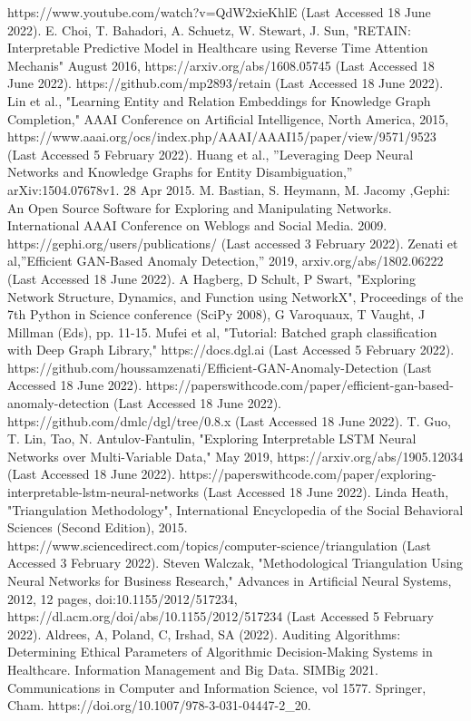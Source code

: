 \documentclass[conference]{IEEEtran}
\begin{document}
\begin{thebibliography}{00}
 https://www.youtube.com/watch?v=QdW2xieKhlE (Last Accessed 18 June 2022).
 E. Choi, T. Bahadori, A. Schuetz, W. Stewart, J. Sun, "RETAIN: Interpretable Predictive Model in Healthcare using Reverse Time Attention Mechanis" August 2016, https://arxiv.org/abs/1608.05745 (Last Accessed 18 June 2022).
 https://github.com/mp2893/retain (Last Accessed 18 June 2022).
 Lin et al., "Learning Entity and Relation Embeddings for Knowledge Graph Completion," AAAI Conference on Artificial Intelligence, North America, 2015, https://www.aaai.org/ocs/index.php/AAAI/AAAI15/paper/view/9571/9523 (Last Accessed 5 February 2022).
 Huang et al., ''Leveraging Deep Neural Networks and Knowledge Graphs for Entity Disambiguation,'' arXiv:1504.07678v1. 28 Apr 2015.
 M. Bastian, S. Heymann, M. Jacomy ,Gephi: An Open Source Software for Exploring and Manipulating Networks. International AAAI Conference on Weblogs and Social Media. 2009.
 https://gephi.org/users/publications/ (Last accessed 3 February 2022).
 Zenati et al,''Efficient GAN-Based Anomaly Detection,'' 2019, arxiv.org/abs/1802.06222 (Last Accessed 18 June 2022).
 A Hagberg, D Schult, P Swart, "Exploring Network Structure, Dynamics, and Function using NetworkX", Proceedings of the 7th Python in Science conference (SciPy 2008), G Varoquaux, T Vaught, J Millman (Eds), pp. 11-15.
 Mufei et al, "Tutorial: Batched graph classification with Deep Graph Library," https://docs.dgl.ai (Last Accessed 5 February 2022).
 https://github.com/houssamzenati/Efficient-GAN-Anomaly-Detection (Last Accessed 18 June 2022).
 https://paperswithcode.com/paper/efficient-gan-based-anomaly-detection (Last Accessed 18 June 2022).
 https://github.com/dmlc/dgl/tree/0.8.x (Last Accessed 18 June 2022).
 T. Guo, T. Lin, Tao, N. Antulov-Fantulin, "Exploring Interpretable LSTM Neural Networks over Multi-Variable Data," May 2019, 
 https://arxiv.org/abs/1905.12034 (Last Accessed 18 June 2022). 
 https://paperswithcode.com/paper/exploring-interpretable-lstm-neural-networks (Last Accessed 18 June 2022).
 Linda Heath, "Triangulation Methodology", International Encyclopedia of the Social Behavioral Sciences (Second Edition), 2015.
 https://www.sciencedirect.com/topics/computer-science/triangulation (Last Accessed 3 February 2022).
 Steven Walczak, "Methodological Triangulation Using Neural Networks for Business Research," Advances in Artificial Neural Systems, 2012, 12 pages, doi:10.1155/2012/517234, https://dl.acm.org/doi/abs/10.1155/2012/517234 (Last Accessed 5 February 2022).
 Aldrees, A, Poland, C, Irshad, SA (2022). Auditing Algorithms: Determining Ethical Parameters of Algorithmic Decision-Making Systems in Healthcare. Information Management and Big Data. SIMBig 2021. Communications in Computer and Information Science, vol 1577. Springer, Cham. https://doi.org/10.1007/978-3-031-04447-2\_20.

\end{thebibliography}
\vspace{12pt}
\end{document}
